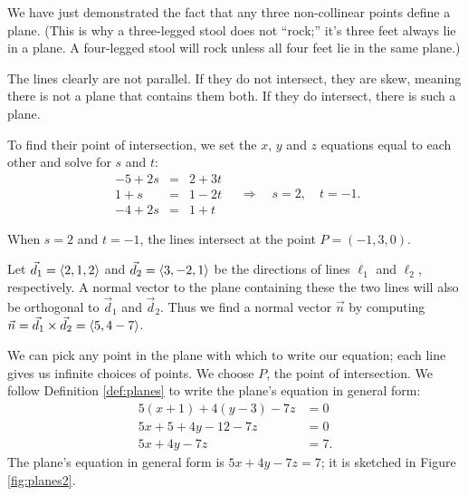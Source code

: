 We have just demonstrated the fact that any three non-collinear points define a plane. (This is why a three-legged stool does not ``rock;'' it's three feet always lie in a plane. A four-legged stool will rock unless all four feet lie in the same plane.)\\

{The lines clearly are not parallel. If they do not intersect, they are skew, meaning there is not a plane that contains them both. If they do intersect, there is such a plane. 

To find their point of intersection, we set the $x$, $y$ and $z$ equations equal to each other and solve for $s$ and $t$:
$$\begin{array}{ccc}
-5+2s &=&2+3t \\ 1+s &=& 1-2t \\ -4+2s &=& 1+t \end{array}\quad  \Rightarrow  \quad s=2,\quad t=-1.$$

When $s=2$ and $t=-1$, the lines intersect at the point $P= (-1,3,0)$. 

Let $\vec d_1 = \left\langle 2,1,2\right\rangle$ and $\vec d_2=\left\langle 3,-2,1\right\rangle$ be the directions of lines $\ell_1$ and $\ell_2$, respectively. A normal vector to the plane containing these the two lines will also be orthogonal to $\vec d_1$ and $\vec d_2$. Thus we find a normal vector $\vec n$ by computing $\vec n = \vec d_1 \times \vec d_2= \left\langle 5,4-7\right\rangle$.

We can pick any point in the plane with which to write our equation; each line gives us infinite choices of points. We choose $P$, the point of intersection. We follow Definition \ref{def:planes} to write the plane's equation in general form:
\begin{align*}
5(x+1) +4(y-3) -7z &= 0 \\
5x + 5 + 4y-12 -7z &= 0\\
5x+4y-7z &= 7.
\end{align*}
The plane's equation in general form is $5x+4y-7z=7$; it is sketched in Figure \ref{fig:planes2}.
}\\

